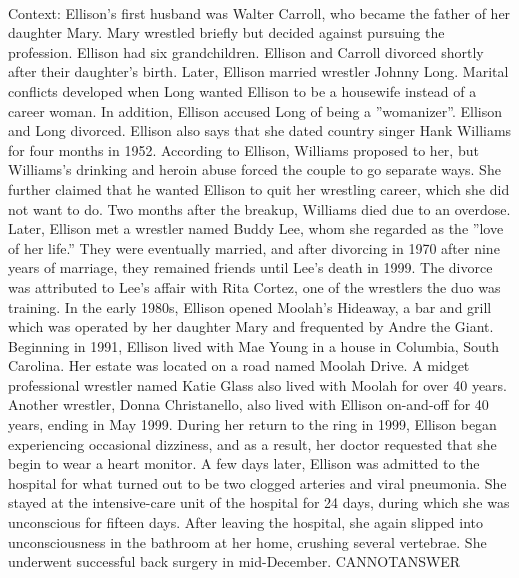 \documentclass[11pt,a4paper, onecolumn]{article}
\begin{document}
\\ Context: Ellison's first husband was Walter Carroll, who became the father of her daughter Mary. Mary wrestled briefly but decided against pursuing the profession. Ellison had six grandchildren. Ellison and Carroll divorced shortly after their daughter's birth. Later, Ellison married wrestler Johnny Long. Marital conflicts developed when Long wanted Ellison to be a housewife instead of a career woman. In addition, Ellison accused Long of being a ''womanizer''. Ellison and Long divorced. Ellison also says that she dated country singer Hank Williams for four months in 1952. According to Ellison, Williams proposed to her, but Williams's drinking and heroin abuse forced the couple to go separate ways. She further claimed that he wanted Ellison to quit her wrestling career, which she did not want to do. Two months after the breakup, Williams died due to an overdose. Later, Ellison met a wrestler named Buddy Lee, whom she regarded as the ''love of her life.'' They were eventually married, and after divorcing in 1970 after nine years of marriage, they remained friends until Lee's death in 1999. The divorce was attributed to Lee's affair with Rita Cortez, one of the wrestlers the duo was training. In the early 1980s, Ellison opened Moolah's Hideaway, a bar and grill which was operated by her daughter Mary and frequented by Andre the Giant. Beginning in 1991, Ellison lived with Mae Young in a house in Columbia, South Carolina. Her estate was located on a road named Moolah Drive. A midget professional wrestler named Katie Glass also lived with Moolah for over 40 years. Another wrestler, Donna Christanello, also lived with Ellison on-and-off for 40 years, ending in May 1999. During her return to the ring in 1999, Ellison began experiencing occasional dizziness, and as a result, her doctor requested that she begin to wear a heart monitor. A few days later, Ellison was admitted to the hospital for what turned out to be two clogged arteries and viral pneumonia. She stayed at the intensive-care unit of the hospital for 24 days, during which she was unconscious for fifteen days. After leaving the hospital, she again slipped into unconsciousness in the bathroom at her home, crushing several vertebrae. She underwent successful back surgery in mid-December. CANNOTANSWER
\end{document}

